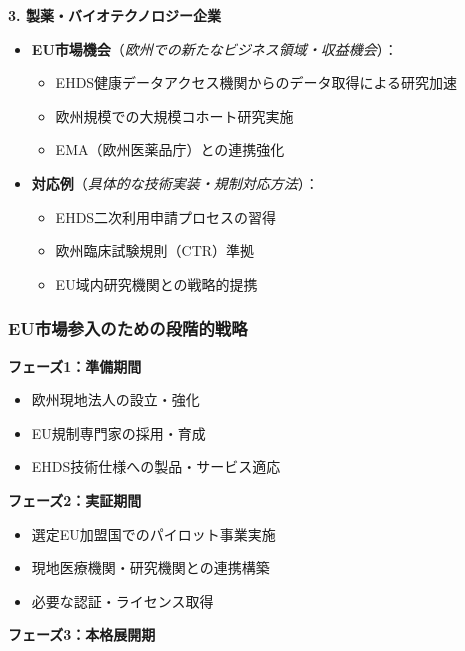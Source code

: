 \documentclass[
  a4paper,
  a4paper,
  11pt]{ltjsbook}
\providecommand{\tightlist}{%
  \setlength{\itemsep}{0pt}\setlength{\parskip}{0pt}}
\begin{document}
\textbf{3. 製薬・バイオテクノロジー企業}

\begin{itemize}
\tightlist
\item
  \textbf{EU市場機会}（\emph{欧州での新たなビジネス領域・収益機会}）：

  \begin{itemize}
  \tightlist
  \item
    EHDS健康データアクセス機関からのデータ取得による研究加速
  \item
    欧州規模での大規模コホート研究実施
  \item
    EMA（欧州医薬品庁）との連携強化
  \end{itemize}
\item
  \textbf{対応例}（\emph{具体的な技術実装・規制対応方法}）：

  \begin{itemize}
  \tightlist
  \item
    EHDS二次利用申請プロセスの習得
  \item
    欧州臨床試験規則（CTR）準拠
  \item
    EU域内研究機関との戦略的提携
  \end{itemize}
\end{itemize}

\subsubsection{EU市場参入のための段階的戦略}\label{euux5e02ux5834ux53c2ux5165ux306eux305fux3081ux306eux6bb5ux968eux7684ux6226ux7565}

\textbf{フェーズ1：準備期間}

\begin{itemize}
\tightlist
\item
  欧州現地法人の設立・強化
\item
  EU規制専門家の採用・育成
\item
  EHDS技術仕様への製品・サービス適応
\end{itemize}

\textbf{フェーズ2：実証期間}

\begin{itemize}
\tightlist
\item
  選定EU加盟国でのパイロット事業実施
\item
  現地医療機関・研究機関との連携構築
\item
  必要な認証・ライセンス取得
\end{itemize}

\textbf{フェーズ3：本格展開期}
\end{document}

